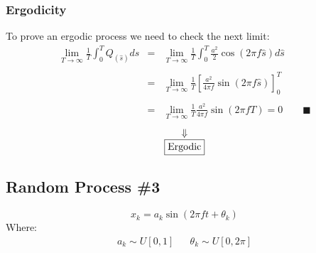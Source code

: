 \documentclass[11pt, a4paper]{article}
\begin{document}
\subsubsection{Ergodicity}
To prove an ergodic process we need to check the next limit:
\begin{equation}
    \begin{array}{rcl}
        \displaystyle \lim_{T\rightarrow\infty}\frac{1}{T}\int_{0}^{T}{Q_{\left(\hat{s}\right)}d\hat{s}} & = & \displaystyle \lim_{T\rightarrow\infty}\frac{1}{T}\int_{0}^{T}{\frac{a^2}{2}\cos\left(2\pi f\hat{s}\right)d\hat{s}} \\\\
        & = & \displaystyle \lim_{T\rightarrow\infty}\frac{1}{T}\left[\frac{a^2}{4\pi f}\sin\left(2\pi f\hat{s}\right)\right]_0^T \\\\
        & = & \displaystyle \lim_{T\rightarrow\infty}\frac{1}{T}\frac{a^2}{4\pi f}\sin\left(2\pi fT\right)=0\qquad\blacksquare
    \end{array}
\end{equation}
\begin{equation*}
    \begin{array}{c}
        \Downarrow \\
        \boxed{$\text{Ergodic}$}
    \end{array}
\end{equation*}
\subsection{Random Process \#3}
\begin{equation}
    x_k=a_k\sin{\left(2\pi ft+\theta_k\right)}
\end{equation}
Where:
\begin{equation}
    \begin{matrix}
        a_k\sim U\left[0,1\right] && \theta_k\sim U\left[0,2\pi\right]
    \end{matrix}
\end{equation}
\end{document}
